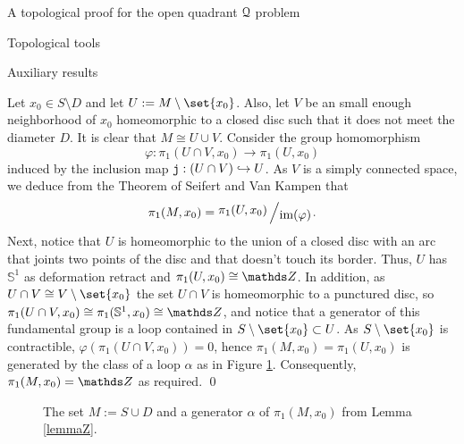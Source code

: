 \documentclass[11pt, a4paper, english, twoside, notitlepage, openright]{report}
\begin{document}
\begin{chapter}{A topological proof for the open quadrant $\mathcal{Q}$ problem}
\begin{section}{Topological tools}
\begin{subsection}{Auxiliary results}
\begin{lemma}
\begin{Proof}
Let $x_0\in S\setminus D$ and let $U:=M\setminus\set{x_0}$. Also, let $V$ be an small enough  neighborhood of $x_0$ homeomorphic to a closed disc such that it does not meet the diameter $D$. It is clear that $M\cong U\cup V$. Consider  the group homomorphism
$$
\varphi:\pi_1(U\cap V,x_0)\to\pi_1(U,x_0)
$$
induced by the inclusion map ${\tt j}: (U\cap V)\hookrightarrow U$. As $V$ is a simply connected space, we deduce from the Theorem of Seifert and Van Kampen \cite[Chapter IV: $\mathsection$4, page 95]{m} that 
$$
\pi_1(M,x_0)=\bigslant{\pi_1(U,x_0)}{\text{im}(\varphi)}.
$$
Next, notice that $U$ is homeomorphic to the union of a closed disc with an arc that joints two points of the disc and that doesn't touch its border. Thus, $U$ has $\mathbb{S}^1$ as deformation retract and $\pi_1(U, x_0)\cong \Z$. In addition, as $U\cap V\cong V\setminus\set{x_0}$ the set $U\cap V$ is homeomorphic to a punctured disc, so $\pi_1(U\cap V, x_0)\cong \pi_1(\mathbb{S}^1,x_0) \cong \Z$, and notice that a generator of this fundamental group is a loop contained  in $S\setminus\set{x_0}\subset U$. As $S\setminus\set{x_0}$ is contractible, $\varphi(\pi_1(U\cap V, x_0))=0$, hence $\pi_1(M, x_0) = \pi_1(U, x_0)$ is generated by the class of a loop $\alpha$ as in Figure \ref{fig:sphereZ}. Consequently, $\pi_1(M, x_0)=\Z$ as required.
\qed
\end{Proof}
\end{lemma}

\begin{figure}[h]
\begin{center}
\caption{The set $M:=S\cup D$ and a generator $\alpha$ of $\pi_1(M,x_0)$ from Lemma \ref{lemmaZ}.}\label{fig:sphereZ}
\end{center}
\end{figure}


\end{subsection}
\end{section}
\end{chapter}
\end{document}
